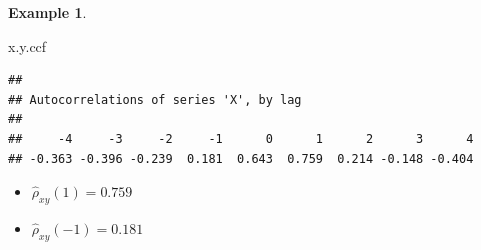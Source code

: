 \documentclass[
]{book}
\newenvironment{Shaded}{\begin{snugshade}}{\end{snugshade}}
\newcommand{\NormalTok}[1]{#1}
\theoremstyle{definition}
\theoremstyle{definition}
\newtheorem{example}{Example}[chapter]
\theoremstyle{definition}
\theoremstyle{definition}
\theoremstyle{remark}
\begin{document}
\begin{example}
\begin{Shaded}
\begin{Highlighting}[]
\NormalTok{x.y.ccf}
\end{Highlighting}
\end{Shaded}

\begin{verbatim}
## 
## Autocorrelations of series 'X', by lag
## 
##     -4     -3     -2     -1      0      1      2      3      4 
## -0.363 -0.396 -0.239  0.181  0.643  0.759  0.214 -0.148 -0.404
\end{verbatim}

\begin{itemize}
\item
  \(\hat \rho_{xy}(1)=0.759\)
\item
  \(\hat \rho_{xy}(-1)=0.181\)
\end{itemize}

\end{example}
\end{document}
